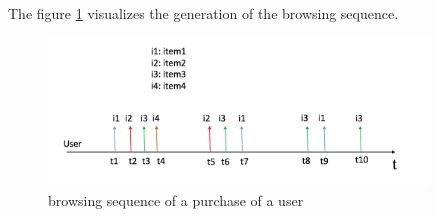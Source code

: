 \documentclass[11pt]{article}
\newcommand\question[2]{\vspace{.25in}\hrule\textbf{#1: #2}\vspace{.5em}\hrule\vspace{.10in}}
\renewcommand\part[1]{\vspace{.10in}\textbf{(#1)}}
\newcommand\algorithm{\vspace{.10in}\textbf{Algorithm: }}
\newcommand\correctness{\vspace{.10in}\textbf{Correctness: }}
\newcommand\runtime{\vspace{.10in}\textbf{Running time: }}
\begin{document}
\raggedright
\newcommand\NAME{Renqin Cai}  %
\newcommand\ANDREWID{rc7ne}     %











The figure \ref{fig:browsingsequence} visualizes the generation of the browsing sequence. 

\begin{figure}[h]
\centering
\includegraphics[width=0.9\textwidth]{browsingSequence.png}
\caption{browsing sequence of a purchase of a user}
\label{fig:browsingsequence}
\end{figure}
\end{document}
